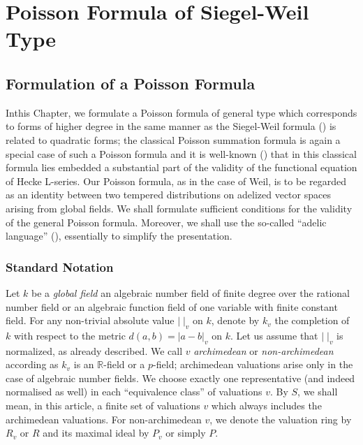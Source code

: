 \chapter{Poisson Formula of Siegel-Weil Type}\label{chap4} %

\section{Formulation of a Poisson
  Formula}\label{chap4:sec1} %

In\pageoriginale this Chapter, we formulate a Poisson formula of general type which
corresponds to forms of higher degree in the same manner as the
Siegel-Weil formula (\cite{Wei 5}) is related to quadratic forms; the
classical Poisson summation formula is again a special case of such a
Poisson formula and it is well-known (\cite{Tat}) that in this classical
formula lies embedded a substantial part of the validity of the
functional equation of Hecke L-series. Our Poisson formula, as in the
case of Weil, is to be regarded as an identity between two tempered
distributions on adelized vector spaces arising from global fields. We
shall formulate sufficient conditions for the validity of the general
Poisson formula. Moreover, we shall use the so-called ``adelic
language'' (\cite{Wei 3}), essentially to simplify the presentation.

\subsection{Standard Notation}\label{chap4:sec1:subsec1} %

Let $k$ be a {\em global field} \ie an algebraic number field of
finite degree over the rational number field or an algebraic function
field of one variable with finite constant field. For any non-trivial
absolute value $|\;|_{v}$ on $k$, denote by $k_{v}$ the completion of
$k$ with respect to the metric $d(a,b)=|a-b|_{v}$ on $k$. Let us
assume that $|\;|_{v}$ is normalized, as already described. We call
$v$ {\em archimedean} or {\em non-archimedean} according as $k_{v}$ is
an $\mathbb{R}$-field or a $p$-field; archimedean\pageoriginale
valuations arise only in the case of algebraic number fields. We
choose exactly one representative (and indeed normalised as well) in
each ``equivalence class'' of valuations $v$. By $S$, we shall mean,
in this article, a finite set of valuations $v$ which always includes
the archimedean valuations. For non-archimedean $v$, we denote the
valuation ring by $R_{v}$ or $R$ and its maximal ideal by $P_{v}$ or
simply $P$.

